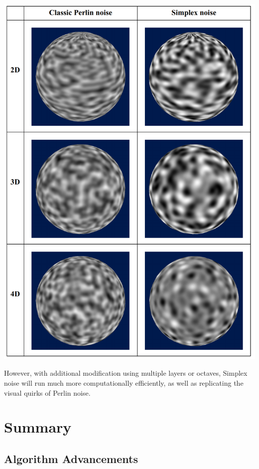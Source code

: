 \documentclass[10pt]{report}
\begin{document}
		\begin{minipage}{\textwidth}
			\centering
			\includegraphics[scale=.25]{perlin vs simplex}
			\label{fig:fig2}
		\end{minipage}
	
		However, with additional modification using multiple layers or octaves, Simplex noise will run much more computationally efficiently, as well as replicating the visual quirks of Perlin noise. 
			
	\vspace{10pt}
	\let\clearpage\relax
	\chapter{Summary}
		
		\section{Algorithm Advancements}
		
\end{document}
